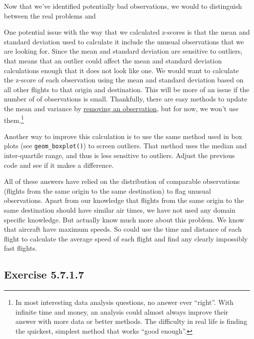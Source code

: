 \documentclass[]{book}
\let\rmarkdownfootnote\footnote%
\def\footnote{\protect\rmarkdownfootnote}
\theoremstyle{plain}
\theoremstyle{remark}
\begin{document}
Now that we've identified potentially bad observations, we would to
distinguish between the real problems and

One potential issue with the way that we calculated z-scores is that the
mean and standard deviation used to calculate it include the unusual
observations that we are looking for. Since the mean and standard
deviation are sensitive to outliers, that means that an outlier could
affect the mean and standard deviation calculations enough that it does
not look like one. We would want to calculate the z-score of each
observation using the mean and standard deviation based on all other
flights to that origin and destination. This will be more of an issue if
the number of of observations is small. Thankfully, there are easy
methods to update the mean and variance by
\href{https://en.wikipedia.org/wiki/Algorithms_for_calculating_variance}{removing
an observation}, but for now, we won't use them.\footnote{In most
  interesting data analysis questions, no answer ever ``right''. With
  infinite time and money, an analysis could almost always improve their
  answer with more data or better methods. The difficulty in real life
  is finding the quickest, simplest method that works ``good enough''.}

Another way to improve this calculation is to use the same method used
in box plots (see \texttt{geom\_boxplot()}) to screen outliers. That
method uses the median and inter-quartile range, and thus is less
sensitive to outliers. Adjust the previous code and see if it makes a
difference.

All of these answers have relied on the distribution of comparable
observations (flights from the same origin to the same destination) to
flag unusual observations. Apart from our knowledge that flights from
the same origin to the same destination should have similar air times,
we have not used any domain specific knowledge. But actually know much
more about this problem. We know that aircraft have maximum speeds. So
could use the time and distance of each flight to calculate the average
speed of each flight and find any clearly impossibly fast flights.

\hypertarget{exercise-5.7.1.7}{%
\subsection*{\texorpdfstring{Exercise
{5.7.1.7}}{Exercise 5.7.1.7}}\label{exercise-5.7.1.7}}
\end{document}
